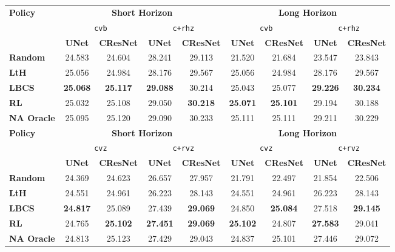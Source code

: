\begin{tabular}{lcccc|cccc}
\toprule
\multirow{3}{*}{\textbf{Policy}} & \multicolumn{4}{c|}{\textbf{Short Horizon}} & \multicolumn{4}{c}{\textbf{Long Horizon}} \\
\cmidrule(l){2-5}\cmidrule(l){6-9}
 & \multicolumn{2}{c}{\texttt{cvb}} & \multicolumn{2}{c|}{\texttt{c+rhz}} & \multicolumn{2}{c}{\texttt{cvb}} & \multicolumn{2}{c}{\texttt{c+rhz}} \\
 \cmidrule(l){2-3}\cmidrule(l){4-5}\cmidrule(l){6-7}\cmidrule(l){8-9}
 & \textbf{UNet} & \textbf{CResNet} & \textbf{UNet} & \textbf{CResNet} & \textbf{UNet} & \textbf{CResNet} & \textbf{UNet} & \textbf{CResNet} \\
 \midrule
\textbf{Random} & {24.583} & 24.604 & 28.241 & 29.113 & 21.520 & 21.684 & 23.547 & 23.843 \\
\textbf{LtH } & {25.056} & 24.984 & {28.176} & {29.567} & 25.056 & 24.984 & 28.176 & 29.567 \\
\textbf{LBCS } & \textbf{25.068} & \textbf{25.117} & \textbf{29.088} & {30.214} & 25.043 & {25.077} & \textbf{29.226} & \textbf{30.234} \\
\textbf{RL } & {25.032} & {25.108} & {29.050} & \textbf{30.218} & \textbf{25.071} & \textbf{25.101} & {29.194} & {30.188} \\
\midrule
\textbf{NA Oracle } & 25.095 & 25.120 & 29.090 & 30.233 & 25.111 & 25.111 & 29.211 & 30.229\\[2mm]
\bottomrule
\toprule
\multirow{3}{*}{\textbf{Policy}} & \multicolumn{4}{c|}{\textbf{Short Horizon}} & \multicolumn{4}{c}{\textbf{Long Horizon}} \\
\cmidrule(l){2-5}\cmidrule(l){6-9}
 & \multicolumn{2}{c}{\texttt{cvz}} & \multicolumn{2}{c|}{\texttt{c+rvz}} & \multicolumn{2}{c}{\texttt{cvz}} & \multicolumn{2}{c}{\texttt{c+rvz}} \\
 \cmidrule(l){2-3}\cmidrule(l){4-5}\cmidrule(l){6-7}\cmidrule(l){8-9}
 & \textbf{UNet} & \textbf{CResNet} & \textbf{UNet} & \textbf{CResNet} & \textbf{UNet} & \textbf{CResNet} & \textbf{UNet} & \textbf{CResNet} \\
 \midrule
\textbf{Random } & {24.369} & 24.623 & 26.657 & 27.957 & 21.791 & 22.497 & 21.854 & 22.506 \\
\textbf{LtH } & {24.551} & 24.961 & {26.223} & {28.143} & 24.551 & 24.961 & 26.223 & 28.143 \\
\textbf{LBCS } & \textbf{24.817} & {25.089} & {27.439} & \textbf{29.069} & 24.850 & \textbf{25.084} & {27.518} & \textbf{29.145} \\
\textbf{RL } & {24.765} & \textbf{25.102} & \textbf{27.451} &  \textbf{29.069} &\textbf{25.102} & {24.807} & \textbf{27.583} & {29.041} \\
\midrule
\textbf{NA Oracle } & 24.813 & {25.123} & 27.429 & 29.043 & {24.837} & {25.101} & 27.446 & 29.072\\
\bottomrule
\end{tabular}

